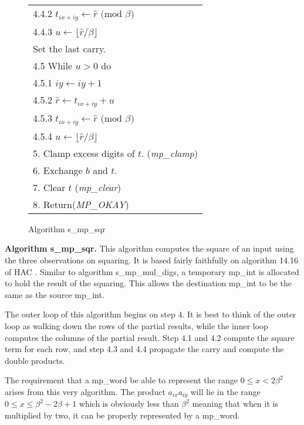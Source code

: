 \documentclass[b5paper]{book}
\begin{document}
\begin{figure}[!here]
\begin{small}
\begin{center}
\begin{tabular}{l}
\hspace{6mm}4.4.2  $t_{ix + iy} \leftarrow \hat r \mbox{ (mod }\beta\mbox{)}$ \\
\hspace{6mm}4.4.3  $u \leftarrow \lfloor \hat r / \beta \rfloor$ \\
\hspace{3mm}Set the last carry. \\
\hspace{3mm}4.5  While $u > 0$ do \\
\hspace{6mm}4.5.1  $iy \leftarrow iy + 1$ \\
\hspace{6mm}4.5.2  $\hat r \leftarrow t_{ix + iy} + u$ \\
\hspace{6mm}4.5.3  $t_{ix + iy} \leftarrow \hat r \mbox{ (mod }\beta\mbox{)}$ \\
\hspace{6mm}4.5.4  $u \leftarrow \lfloor \hat r / \beta \rfloor$ \\
5.  Clamp excess digits of $t$.  (\textit{mp\_clamp}) \\
6.  Exchange $b$ and $t$. \\
7.  Clear $t$ (\textit{mp\_clear}) \\
8.  Return(\textit{MP\_OKAY}) \\
\hline
\end{tabular}
\end{center}
\end{small}
\caption{Algorithm s\_mp\_sqr}
\end{figure}

\textbf{Algorithm s\_mp\_sqr.}
This algorithm computes the square of an input using the three observations on squaring.  It is based fairly faithfully on  algorithm 14.16 of HAC
\cite[pp.596-597]{HAC}.  Similar to algorithm s\_mp\_mul\_digs, a temporary mp\_int is allocated to hold the result of the squaring.  This allows the 
destination mp\_int to be the same as the source mp\_int.

The outer loop of this algorithm begins on step 4. It is best to think of the outer loop as walking down the rows of the partial results, while
the inner loop computes the columns of the partial result.  Step 4.1 and 4.2 compute the square term for each row, and step 4.3 and 4.4 propagate
the carry and compute the double products.  

The requirement that a mp\_word be able to represent the range $0 \le x < 2 \beta^2$ arises from this
very algorithm.  The product $a_{ix}a_{iy}$ will lie in the range $0 \le x \le \beta^2 - 2\beta + 1$ which is obviously less than $\beta^2$ meaning that
when it is multiplied by two, it can be properly represented by a mp\_word.
\end{document}
